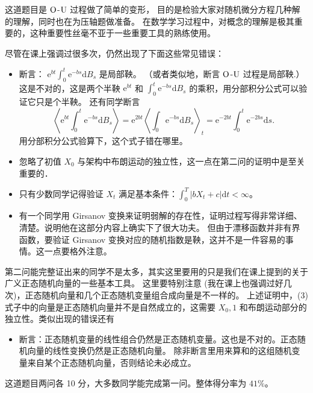     \textcolor{0000cc}{\qquad 这道题目是 ${\rm O}$-${\rm U}$ 过程做了简单的变形，
    目的是检验大家对随机微分方程几种解的理解，同时也在为压轴题做准备。
    在数学学习过程中，对概念的理解是极其重要的，这种重要性丝毫不亚于一些重要工具的熟练使用。

    \qquad 尽管在课上强调过很多次，仍然出现了下面这些常见错误：
    \begin{itemize}
    \item 断言： $\mathrm{e}^{bt} \int_{0}^{t} \mathrm{e}^{-bs} \mathrm{d} B_{s}$ 是局部鞅。
    （或者类似地，断言 ${\rm O}$-${\rm U}$ 过程是局部鞅.）这是不对的，这是两个半鞅 $\mathrm{e}^{bt}$ 和 $\int_{0}^{t} \mathrm{e}^{-bs} \mathrm{d} B_{s}$ 的乘积，用分部积分公式可以验证它只是个半鞅。
    还有同学断言
    $$\left\langle\mathrm{e}^{bt} \int_{0}^{t} \mathrm{e}^{-bs} \mathrm{d} B_{s}\right\rangle
    =\mathrm{e}^{2bt}\left\langle\int_{0} \mathrm{e}^{-bs} \mathrm{d} B_{s}\right\rangle_{t}
    =\mathrm{e}^{-2bt} \int_{0}^{t} \mathrm{e}^{-2bs} \mathrm{d} s.$$
    用分部积分公式验算下，这个式子错在哪里。
    
    \item 忽略了初值 $X_{0}$ 与架构中布朗运动的独立性，这一点在第二问的证明中是至关重要的．
    
    \item 只有少数同学记得验证 $X_{t}$ 满足基本条件：$\int_{0}^{T}\left|b X_{t}+c\right| \mathrm{d} t<\infty$。
    
    \item 有一个同学用 Girsanov 变换来证明弱解的存在性，证明过程写得非常详细、清楚。说明他在这部分内容上确实下了很大功夫。
    但由于漂移函数并非有界函数，要验证 Girsanov 变换对应的随机指数是鞅，这并不是一件容易的事情。这一点要格外注意。
    \end{itemize}

    \qquad 第二问能完整证出来的同学不是太多，其实这里要用的只是我们在课上提到的关于广义正态随机向量的一些基本工具。
    这里要特别注意 (我在课上也强调过好几次)，正态随机向量和几个正态随机变量组合成向量是不一样的。
    上述证明中，(3) 式子中的向量是正态随机向量并不是自然成立的，这需要 $X_{0}, 1$ 和布朗运动部分的独立性。类似出现的错误还有
    \begin{itemize}
    \item 断言：正态随机变量的线性组合仍然是正态随机变量。这也是不对的。正态随机向量的线性变换仍然是正态随机向量。
    除非断言里用来算和的这组随机变量来自某个正态随机向量，否则结论未必成立。
    \end{itemize}
    \qquad 这道题目两问各 10 分，大多数同学能完成第一问。整体得分率为 $41 \%$。}

